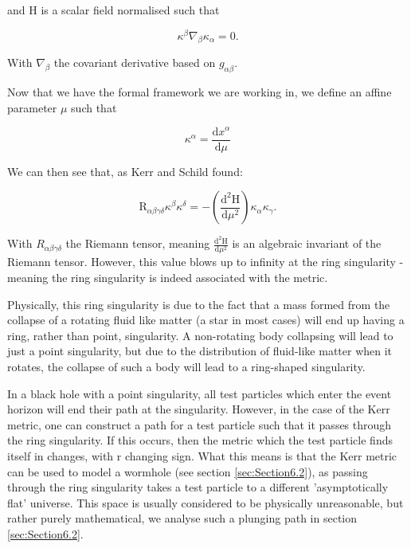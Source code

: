\documentclass[oneside,openright,frontopenright, singlespacing]{dmathesis}
\begin{document}
\vspace{1em}
	and H is a scalar field normalised such that

	\[\kappa^\beta\nabla_\beta\kappa_\alpha=0.\]

\vspace{1em}
	With $\nabla_\beta$ the covariant derivative based on $g_{\alpha\beta}$.

\vspace{1em}
	Now that we have the formal framework we are working in, we define an affine parameter $\mu$ such that

	\[\kappa^\alpha=\frac{\mbox{d}x^\alpha}{\mbox{d}\mu}\]

\vspace{1em}
	We can then see that, as Kerr and Schild found:

	\[\mbox{R}_{\alpha\beta\gamma\delta}\kappa^\beta\kappa^\delta = -\left(\frac{\mbox{d}^2\mbox{H}}{\mbox{d}\mu^2}\right)\kappa_\alpha\kappa_\gamma.\]

\vspace{1em}
	With $R_{\alpha\beta\gamma\delta}$ the Riemann tensor, meaning $\frac{\mbox{d}^2\mbox{H}}{\mbox{d}\mu^2}$ is an algebraic invariant of the Riemann tensor. However, this value blows up to infinity at the ring singularity - meaning the ring singularity is indeed associated with the metric.

\vspace{1em}
	Physically, this ring singularity is due to the fact that a mass formed from the collapse of a rotating fluid like matter (a star in most cases) will end up having a ring, rather than point, singularity. A non-rotating body collapsing will lead to just a point singularity, but due to the distribution of fluid-like matter when it rotates, the collapse of such a body will lead to a ring-shaped singularity.

\vspace{1em}
	In a black hole with a point singularity, all test particles which enter the event horizon will end their path at the singularity. However, in the case of the Kerr metric, one can construct a path for a test particle such that it passes through the ring singularity. If this occurs, then the metric which the test particle finds itself in changes, with r changing sign. What this means is that the Kerr metric can be used to model a wormhole (see section \ref{sec:Section6.2}), as passing through the ring singularity takes a test particle to a different 'asymptotically flat' universe. This space is usually considered to be physically unreasonable, but rather purely mathematical, we analyse such a plunging path in section \ref{sec:Section6.2}.
\end{document}

